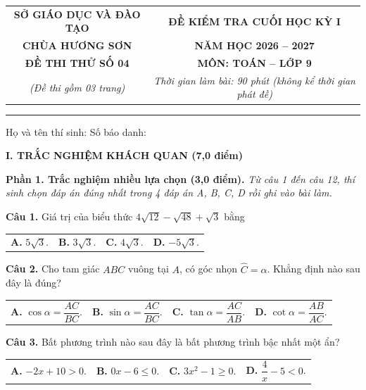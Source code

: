 \documentclass[11pt,a4paper]{article}
\begin{document}
\noindent
\begin{tabular*}{\linewidth}{@{\extracolsep{\fill}}cc@{}}
\textbf{SỞ GIÁO DỤC VÀ ĐÀO TẠO} & \textbf{ĐỀ KIỂM TRA CUỐI HỌC KỲ I} \\
\textbf{CHÙA HƯƠNG SƠN} & \textbf{NĂM HỌC 2026 -- 2027} \\
\textbf{ĐỀ THI THỬ SỐ 04} & \textbf{MÔN: TOÁN -- LỚP 9} \\
\textit{(Đề thi gồm 03 trang)} & \textit{Thời gian làm bài: 90 phút (không kể thời gian phát đề)} \\
\end{tabular*}

\vspace{2mm}
\noindent
\rule{\linewidth}{0.8pt}

\vspace{1mm}
\noindent
Họ và tên thí sinh: \dotfill Số báo danh: \dotfill

\vspace{2mm}
\noindent
\textbf{\large I. TRẮC NGHIỆM KHÁCH QUAN (7,0 điểm)}

\vspace{1mm}
\noindent
\textbf{Phần 1. Trắc nghiệm nhiều lựa chọn (3,0 điểm).} \textit{Từ câu 1 đến câu 12, thí sinh chọn đáp án đúng nhất trong 4 đáp án A, B, C, D rồi ghi vào bài làm.}

\vspace{1.5mm}
\textbf{Câu 1.} Giá trị của biểu thức $4\sqrt{12} - \sqrt{48} + \sqrt{3}$ bằng\\
\begin{tabularx}{\linewidth}{XXXX}
\textbf{A.} $5\sqrt{3}$. & \textbf{B.} $3\sqrt{3}$. & \textbf{C.} $4\sqrt{3}$. & \textbf{D.} $-5\sqrt{3}$.
\end{tabularx}

\vspace{1.5mm}
\textbf{Câu 2.} Cho tam giác $ABC$ vuông tại $A$, có góc nhọn $\widehat{C} = \alpha$. Khẳng định nào sau đây là đúng?\\
\begin{tabularx}{\linewidth}{XXXX}
\textbf{A.} $\cos \alpha = \dfrac{AC}{BC}$. & \textbf{B.} $\sin \alpha = \dfrac{AC}{BC}$. & \textbf{C.} $\tan \alpha = \dfrac{AC}{AB}$. & \textbf{D.} $\cot \alpha = \dfrac{AB}{AC}$.
\end{tabularx}

\vspace{1.5mm}
\textbf{Câu 3.} Bất phương trình nào sau đây là bất phương trình bậc nhất một ẩn?\\
\begin{tabularx}{\linewidth}{XXXX}
\textbf{A.} $-2x + 10 > 0$. & \textbf{B.} $0x - 6 \le 0$. & \textbf{C.} $3x^2 - 1 \ge 0$. & \textbf{D.} $\dfrac{4}{x} - 5 < 0$.
\end{tabularx}
\end{document}
